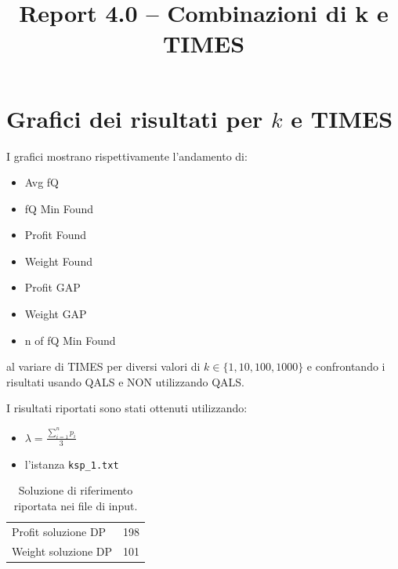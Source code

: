 \documentclass[a4paper,12pt]{article}
\title{Report 4.0 -- Combinazioni di k e TIMES}
\begin{document}
\maketitle

\newpage

\section{Grafici dei risultati per $k$ e TIMES}

I grafici mostrano rispettivamente l'andamento di:
\begin{itemize} 
    \item Avg fQ           
    \item fQ Min Found     
    \item Profit Found     
    \item Weight Found     
    \item Profit GAP       
    \item Weight GAP       
    \item n of fQ Min Found
\end{itemize}
al variare di TIMES per diversi valori di $k \in \{1,10,100,1000\}$ e confrontando
i risultati usando QALS e NON utilizzando QALS.

I risultati riportati sono stati ottenuti utilizzando:

\begin{itemize}
    \item $\lambda = \frac{\sum_{i=1}^{n} p_i}{3}$
    \item l'istanza \texttt{ksp\_1.txt}
\end{itemize}

\begin{table}[H]
\centering
\begin{tabular}{lc}
\hline
Profit soluzione DP & 198 \\
Weight soluzione DP & 101 \\
\hline
\end{tabular}
\caption{Soluzione di riferimento riportata nei file di input.}
\label{tab:knapsack-solution}
\end{table}
\end{document}
